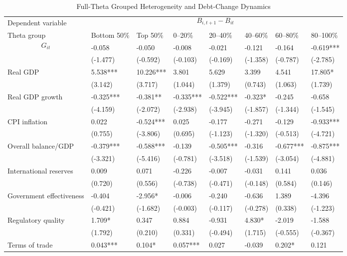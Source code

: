\begin{table}[H]\centering
\begin{threeparttable}
\caption{Full-Theta Grouped Heterogeneity and Debt-Change Dynamics}
\label{tab:theta_group_heterogeneity_debt}
\scriptsize
\begin{tabularx}{\textwidth}{lYYYYYYY}
\toprule
Dependent variable &  \\
\cmidrule(lr){2-8}
Theta group & Bottom 50\% & Top 50\% & 0--20\% & 20--40\% & 40--60\% & 60--80\% & 80--100\% \\
\midrule
$$G_{it}$$ & -0.058 & -0.050 & -0.008 & -0.021 & -0.121 & -0.164 & -0.619*** \\
  & (-1.477) & (-0.592) & (-0.103) & (-0.169) & (-1.358) & (-0.787) & (-2.785) \\
Real GDP & 5.538*** & 10.226*** & 3.801 & 5.629 & 3.399 & 4.541 & 17.805* \\
  & (3.142) & (3.717) & (1.044) & (1.379) & (0.743) & (1.063) & (1.739) \\
Real GDP growth & -0.325*** & -0.381** & -0.335*** & -0.522*** & -0.323* & -0.245 & -0.658 \\
  & (-4.159) & (-2.072) & (-2.938) & (-3.945) & (-1.857) & (-1.344) & (-1.545) \\
CPI inflation & 0.022 & -0.524*** & 0.025 & -0.177 & -0.271 & -0.129 & -0.933*** \\
  & (0.755) & (-3.806) & (0.695) & (-1.123) & (-1.320) & (-0.513) & (-4.721) \\
Overall balance/GDP & -0.379*** & -0.588*** & -0.139 & -0.505*** & -0.316 & -0.677*** & -0.875*** \\
  & (-3.321) & (-5.416) & (-0.781) & (-3.518) & (-1.539) & (-3.054) & (-4.881) \\
International reserves & 0.009 & 0.071 & -0.226 & -0.007 & -0.031 & 0.141 & 0.036 \\
  & (0.720) & (0.556) & (-0.738) & (-0.471) & (-0.148) & (0.584) & (0.146) \\
Government effectiveness & -0.404 & -2.956* & -0.006 & -0.240 & -0.636 & 1.389 & -4.396 \\
  & (-0.421) & (-1.682) & (-0.003) & (-0.117) & (-0.278) & (0.338) & (-1.223) \\
Regulatory quality & 1.709* & 0.347 & 0.884 & -0.931 & 4.830* & -2.019 & -1.588 \\
  & (1.792) & (0.210) & (0.331) & (-0.494) & (1.715) & (-0.555) & (-0.367) \\
Terms of trade & 0.043*** & 0.104* & 0.057*** & 0.027 & -0.039 & 0.202* & 0.121 \\

\end{tabularx}
\end{threeparttable}
\end{table}
